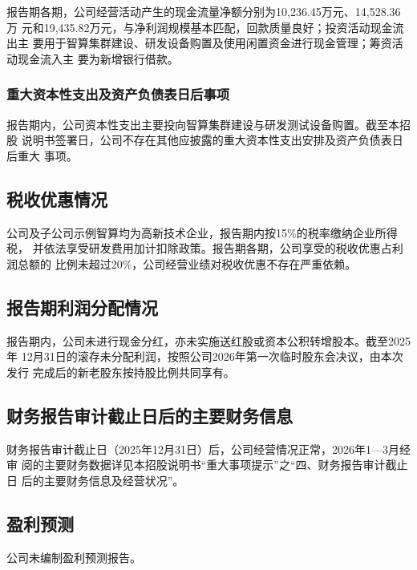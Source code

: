 报告期各期，公司经营活动产生的现金流量净额分别为10,236.45万元、14,528.36万
元和19,435.82万元，与净利润规模基本匹配，回款质量良好；投资活动现金流出主
要用于智算集群建设、研发设备购置及使用闲置资金进行现金管理；筹资活动现金流入主
要为新增银行借款。

\subsubsection{重大资本性支出及资产负债表日后事项}

报告期内，公司资本性支出主要投向智算集群建设与研发测试设备购置。截至本招股
说明书签署日，公司不存在其他应披露的重大资本性支出安排及资产负债表日后重大
事项。

\subsection{税收优惠情况}

公司及子公司示例智算均为高新技术企业，报告期内按15\%的税率缴纳企业所得税，
并依法享受研发费用加计扣除政策。报告期各期，公司享受的税收优惠占利润总额的
比例未超过20\%，公司经营业绩对税收优惠不存在严重依赖。

\subsection{报告期利润分配情况}

报告期内，公司未进行现金分红，亦未实施送红股或资本公积转增股本。截至2025年
12月31日的滚存未分配利润，按照公司2026年第一次临时股东会决议，由本次发行
完成后的新老股东按持股比例共同享有。

\subsection{财务报告审计截止日后的主要财务信息}

财务报告审计截止日（2025年12月31日）后，公司经营情况正常，2026年1—3月经审
阅的主要财务数据详见本招股说明书``重大事项提示''之``四、财务报告审计截止日
后的主要财务信息及经营状况''。

\subsection{盈利预测}

公司未编制盈利预测报告。

